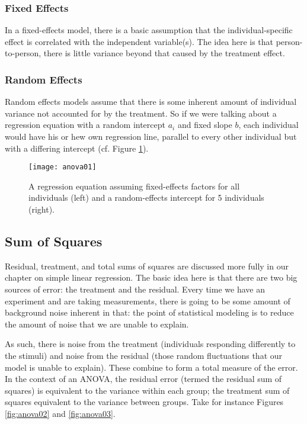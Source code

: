 \subsubsection{Fixed Effects}

In a fixed-effects model, there is a basic assumption that the individual-specific effect is correlated with the independent variable(s). The idea here is that person-to-person, there is little variance beyond that caused by the treatment effect.

\subsubsection{Random Effects}

Random effects models assume that there is some inherent amount of individual variance not accounted for by the treatment. So if we were talking about a regression equation with a random intercept $a_i$ and fixed slope $b$, each individual would have his or hew own regression line, parallel to every other individual but with a differing intercept (cf. Figure \ref{fig:anova01}).

\begin{figure}[htp]
\texttt{[image: anova01]}
\caption{A regression equation assuming fixed-effects factors for all individuals (left) and a random-effects intercept for 5 individuals (right).}
\label{fig:anova01}
\end{figure}

\subsection{Sum of Squares}

Residual, treatment, and total sums of squares are discussed more fully in our chapter on simple linear regression. The basic idea here is that there are two big sources of error: the treatment and the residual. Every time we have an experiment and are taking measurements, there is going to be some amount of background noise inherent in that: the point of statistical modeling is to reduce the amount of noise that we are unable to explain.

As such, there is noise from the treatment (individuals responding differently to the stimuli) and noise from the residual (those random fluctuations that our model is unable to explain). These combine to form a total measure of the error. In the context of an ANOVA, the residual error (termed the residual sum of squares) is equivalent to the variance within each group; the treatment sum of squares equivalent to the variance between groups. Take for instance Figures \ref{fig:anova02} and \ref{fig:anova03}.

